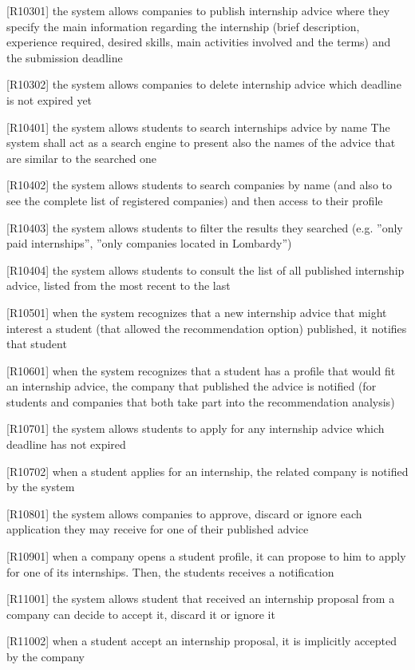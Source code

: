 		[R10301] the system allows companies to publish internship advice where they specify the main information regarding the internship (brief description, experience required, desired skills, main activities involved and the terms) and the submission deadline
		
		[R10302] the system allows companies to delete internship advice which deadline is not expired yet
		
		[R10401] the system allows students to search internships advice by name The system shall act as a search engine to present also the names of the advice that are similar to the searched one
		
		[R10402] the system allows students to search companies by name (and also to see the complete list of registered companies) and then access to their profile
		
		[R10403] the system allows students to filter the results they searched (e.g. ”only paid internships”, ”only companies located in Lombardy”)
		
		[R10404] the system allows students to consult the list of all published internship advice, listed from the most recent to the last
		
		[R10501] when the system recognizes that a new internship advice that might interest a student (that allowed the recommendation option) published, it notifies that student
		
		[R10601] when the system recognizes that a student has a profile that would fit an internship advice, the company that published the advice is notified (for students and companies that both take part into the recommendation analysis)
		
		[R10701] the system allows students to apply for any internship advice which deadline has not expired
		
		[R10702] when a student applies for an internship, the related company is notified by the system
		
		[R10801] the system allows companies to approve, discard or ignore each application they may receive for one of their published advice
		
		[R10901] when a company opens a student profile, it can propose to him to apply for one of its internships. Then, the students receives a notification
		
		[R11001] the system allows student that received an internship proposal from a company can decide to accept it, discard it or ignore it
		
		[R11002] when a student accept an internship proposal, it is implicitly accepted by the company 
		
